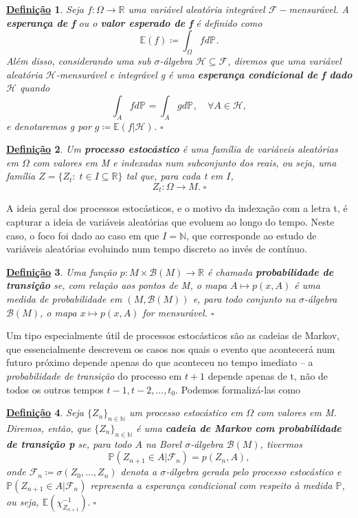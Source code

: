 \documentclass[12pt]{article}
\newtheorem*{def*}{\underline{Definição}}
\theoremstyle{definition}
\begin{document}
\begin{def*}
	Seja \(f:\Omega \rightarrow \mathbb{R}\) uma variável aleatória integrável \(\mathcal{F}-\)mensurável. A \textbf{esperança de f} ou o \textbf{valor esperado de f} é definido como
	\[
		\mathbb{E}(f)\coloneqq \int_{\Omega }f d\mathbb{P}_{}.
	\]
	Além disso, considerando uma sub \(\sigma \)-álgebra \(\mathcal{H}\subseteq \mathcal{F}\), diremos que uma variável aleatória \(\mathcal{H}\)-mensurável e integrável g é uma \textbf{esperança condicional de f dado \(\mathcal{H}\)} quando
	\[
		\int_{A}f d\mathbb{P}_{} = \int_{A}g d\mathbb{P}_{},\quad \forall A\in \mathcal{H},
	\]
	e denotaremos g por \(g\coloneqq \mathbb{E}(f|\mathcal{H})\). \(\square\)
\end{def*}

\begin{def*}
	Um \textbf{processo estocástico} é uma família de variáveis aleatórias em \(\Omega \) com valores em M e indexadas num subconjunto dos reais, ou seja, uma família \(Z=\{Z_{t}:\; t\in I\subseteq \mathbb{R}\}\) tal que, para cada t em \(I\),
	\[
		Z_t:\Omega \rightarrow M. \; \square
	\]
\end{def*}

A ideia geral dos processos estocásticos, e o motivo da indexação com a letra t, é capturar a ideia de variáveis aleatórias que evoluem ao longo do tempo. Neste caso, o foco foi dado ao caso em que \(I=\mathbb{N}\), que corresponde ao estudo de variáveis aleatórias evoluindo num tempo discreto ao invés de contínuo.

\begin{def*}
	Uma função \(p:M\times \mathcal{B}(M)\rightarrow \mathbb{R}\) é chamada \textbf{probabilidade de transição} se, com relação aos pontos de M, o mapa \(A\mapsto p(x, A)\) é uma medida de probabilidade em \((M, \mathcal{B}(M))\) e, para todo conjunto na \(\sigma \)-álgebra \(\mathcal{B}(M)\), o mapa \(x\mapsto p(x, A)\) for mensurável. \(\square\)
\end{def*}

Um tipo especialmente útil de processos estocásticos são as cadeias de Markov, que essencialmente descrevem os casos nos quais o evento que acontecerá num futuro próximo depende apenas do que aconteceu no tempo imediato -- a \textit{probabilidade de transição} do processo em \(t+1\) depende apenas de t, não de todos os outros tempos \(t-1, t-2, \dotsc , t_{0}\). Podemos formalizá-las como
\begin{def*}
	Seja \( \{Z_{n}\}_{n\in \mathbb{N}}\) um processo estocástico em \(\Omega \) com valores em M. Diremos, então, que \(\{Z_{n}\}_{n\in \mathbb{N}}\) é uma \textbf{cadeia de Markov com probabilidade de transição p} se, para todo \(A\) na Borel \(\sigma \)-álgebra \(\mathcal{B}(M)\), tivermos
	\[
		\mathbb{P}(Z_{n+1}\in A| \mathcal{F}_{n})=p(Z_{n}, A),
	\]
	onde \(\mathcal{F}_{n}\coloneqq \sigma (Z_{0}, \dotsc , Z_{n})\) denota a \(\sigma \)-álgebra gerada pelo processo estocástico e \(\mathbb{P}(Z_{n+1}\in A| \mathcal{F}_{n})\) representa a esperança condicional com respeito à medida \(\mathbb{P}\), ou seja, \(\mathbb{E}(\chi^{-1}_{Z_{n+1}}).\;\square\)
\end{def*}
\end{document}
